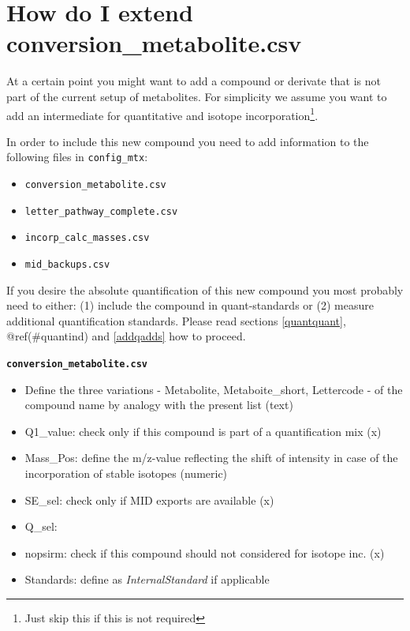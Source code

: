 \documentclass[]{book}
\providecommand{\tightlist}{%
  \setlength{\itemsep}{0pt}\setlength{\parskip}{0pt}}
\let\rmarkdownfootnote\footnote%
\def\footnote{\protect\rmarkdownfootnote}
\theoremstyle{definition}
\theoremstyle{definition}
\theoremstyle{definition}
\theoremstyle{remark}
\begin{document}
\section{How do I extend conversion\_metabolite.csv}\label{extendconse}

At a certain point you might want to add a compound or derivate that is
not part of the current setup of metabolites. For simplicity we assume
you want to add an intermediate for quantitative and isotope
incorporation\footnote{Just skip this if this is not required}.

In order to include this new compound you need to add information to the
following files in \texttt{config\_mtx}:

\begin{itemize}
\tightlist
\item
  \texttt{conversion\_metabolite.csv}
\item
  \texttt{letter\_pathway\_complete.csv}
\item
  \texttt{incorp\_calc\_masses.csv}
\item
  \texttt{mid\_backups.csv}
\end{itemize}

If you desire the absolute quantification of this new compound you most
probably need to either: (1) include the compound in quant-standards or
(2) measure additional quantification standards. Please read sections
\ref{quantquant}, @ref(\#quantind) and \ref{addqadds} how to proceed.

\textbf{\texttt{conversion\_metabolite.csv}}

\begin{itemize}
\tightlist
\item
  Define the three variations - Metabolite, Metaboite\_short, Lettercode
  - of the compound name by analogy with the present list (text)
\item
  Q1\_value: check only if this compound is part of a quantification mix
  (x)
\item
  Mass\_Pos: define the m/z-value reflecting the shift of intensity in
  case of the incorporation of stable isotopes (numeric)
\item
  SE\_sel: check only if MID exports are available (x)
\item
  Q\_sel:
\item
  nopsirm: check if this compound should not considered for isotope inc.
  (x)
\item
  Standards: define as \emph{InternalStandard} if applicable
\end{itemize}
\end{document}
